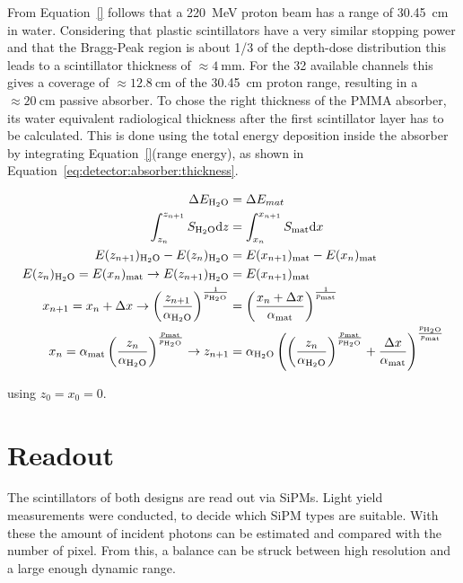 From Equation~\ref{} follows that a \SI{220}{\mega\electronvolt} proton beam has a range of \SI{30.45}{\cm} in water.
Considering that plastic scintillators have a very similar stopping power and that the Bragg-Peak region is about 1/3 of the depth-dose distribution this leads to a scintillator thickness of $\approx\SI{4}{\mm}$.
For the 32 available channels this gives a coverage of $\approx \SI{12.8}{\centi\meter}$ of the \SI{30.45}{\centi\meter} proton range, resulting in a $\approx\SI{20}{\cm}$ passive absorber.
To chose the right thickness of the PMMA absorber, its water equivalent radiological thickness after the first scintillator layer has to be calculated.
This is done using the total energy deposition inside the absorber by integrating Equation~\ref{}(range energy), as shown in Equation~\ref{eq:detector:absorber:thickness}.

\begin{align}
    \label{eq:detector:absorber:thickness}
    \Delta E_{\ce{H2O}} &= \Delta E_{mat} \\
    \int_{z_n}^{z_{n+1}} S_{\ce{H2O}}\text{d}z &= \int_{x_n}^{x_{n+1}} S_\text{mat}\text{d}x \\
    E(z_{n+1})_{\ce{H2O}}-E(z_n)_{\ce{H2O}}&= E(x_{n+1})_{\text{mat}}-E(x_n)_{\text{mat}}\\
    E(z_n)_{\ce{H2O}} = E(x_n)_{\text{mat}} \rightarrow E(z_{n+1})_{\ce{H2O}} &= E(x_{n+1})_{\text{mat}} \\
    x_{n+1} = x_n + \Delta x \rightarrow \left(\frac{z_{n+1}}{\alpha_{\ce{H2O}}}\right)^{\frac{1}{p_{\ce{H2O}}}} &= \left(\frac{x_{n}+\Delta x}{\alpha_{\text{mat}}}\right)^{\frac{1}{p_{\text{mat}}}} \\
    x_{n} = \alpha_{\text{mat}} \left(\frac{z_n}{\alpha_{\ce{H2O}}}\right)^{\frac{p_{\text{mat}}}{p_{\ce{H2O}}}} \rightarrow z_{n+1} &= \alpha_{\ce{H2O}} \left(\left(\frac{z_n}{\alpha_{\ce{H2O}}}\right)^{\frac{p_{\text{mat}}}{p_{\ce{H2O}}}} + \frac{\Delta x}{\alpha_{\text{mat}}}\right)^{\frac{p_{\ce{H2O}}}{p_{\text{mat}}}}
\end{align}

using $z_0 = x_0 = 0$.

\section{Readout}\label{section:readout}
The scintillators of both designs are read out via SiPMs.
Light yield measurements were conducted, to decide which SiPM types are suitable.
With these the amount of incident photons can be estimated and compared with the number of pixel.
From this, a balance can be struck between high resolution and a large enough dynamic range.

